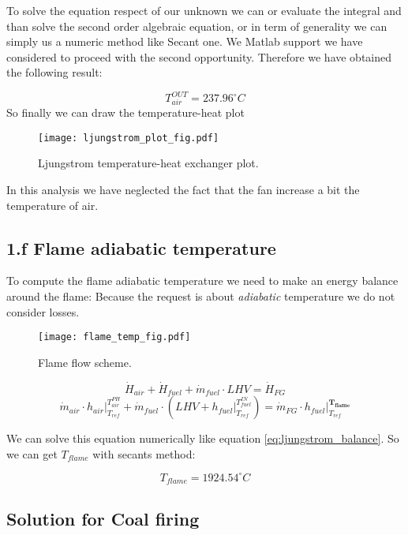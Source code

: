 \documentclass[a4paper,12pt]{article}
\begin{document}
{To solve the equation respect of our unknown we can or evaluate the integral and than solve the second order algebraic equation, or in term of generality we can simply us a numeric method like Secant one. We Matlab support we have considered to proceed with the second opportunity. Therefore we have obtained the following result:

\begin{equation}
T_{air}^{OUT} = 237.96 ^{\circ}C
\end{equation}
So finally we can draw the temperature-heat plot 
\begin{figure}[h]
  \centering
  \texttt{[image: ljungstrom\_plot\_fig.pdf]}
  \caption[scale=0.5]{Ljungstrom temperature-heat exchanger plot.}
\end{figure}

In this analysis we have neglected the fact that the fan increase a bit the temperature of air.

\subsection*{1.f Flame adiabatic temperature} 
To compute the flame adiabatic temperature we need to make an energy balance around the flame:
Because the request is about \emph{adiabatic} temperature we do not consider losses.

\begin{figure}[h]
 \centering
  \caption{Flame flow scheme.}
  \texttt{[image: flame\_temp\_fig.pdf]}
\end{figure}
\vspace*{-0.5cm}
\begin{equation}
\dot{H}_{air} + \dot{H}_{fuel} + \dot{m}_{fuel} \cdot LHV = \dot{H}_{FG}
\end{equation}
\begin{equation}
\dot{m}_{air} \cdot h_{air}\bigg\vert_{T_{ref}}^{T_{air}^{PH}} +
\dot{m}_{fuel} \cdot \left(LHV + h_{fuel}\bigg\vert_{T_{ref}}^{T_{fuel}^{IN}}\right)
 = \dot{m}_{FG} \cdot h_{fuel}\bigg\vert_{T_{ref}}^{\boldsymbol{T_{flame}} } 
\end{equation}

We can solve this equation numerically like equation \ref{eq:ljungstrom_balance}. So we can get $T_{flame}$ with secants method:

\begin{equation}
T_{flame} = 1924.54 ^{\circ}C
\end{equation}

\subsection*{Solution for Coal firing}

}
\end{document}
